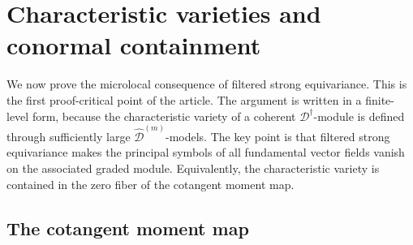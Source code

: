 \documentclass[11pt]{amsart}
\theoremstyle{plain}
\theoremstyle{definition}
\theoremstyle{remark}
\begin{document}
\section{Characteristic varieties and conormal containment}
\label{sec:characteristic}

We now prove the microlocal consequence of filtered strong equivariance.  This is the
first proof-critical point of the article.  The argument is written in a
finite-level form, because the characteristic variety of a coherent
\(\mathscr D^\dagger\)-module is defined through sufficiently large
\(\widehat{\mathscr D}^{(m)}\)-models.  The key point is that filtered strong
equivariance makes the principal symbols of all fundamental vector fields
vanish on the associated graded module.  Equivalently, the characteristic
variety is contained in the zero fiber of the cotangent moment map.

\subsection{The cotangent moment map}
\end{document}
